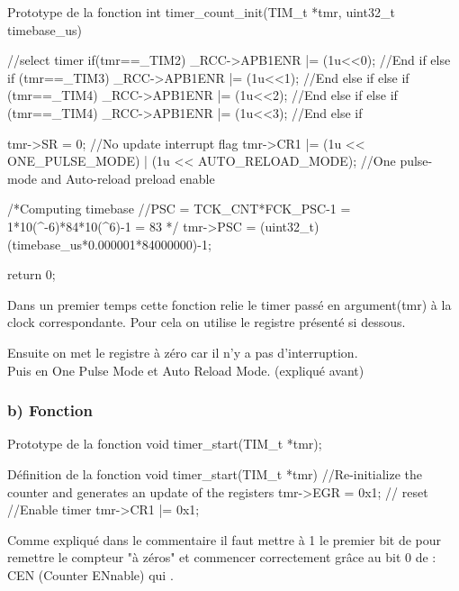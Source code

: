 \begin{Cpp}{Prototype de la fonction } 
int timer_count_init(TIM_t *tmr, uint32_t timebase_us)  {

		//select timer
		if(tmr==_TIM2) {
			_RCC->APB1ENR |= (1u<<0);	
		}//End if
		else if (tmr==_TIM3) {
			_RCC->APB1ENR |= (1u<<1);
		}//End else if
		else if (tmr==_TIM4) {
			_RCC->APB1ENR |= (1u<<2);
		}//End else if		
		else if (tmr==_TIM4) {
			_RCC->APB1ENR |= (1u<<3);
		}//End else if	
        
    	tmr->SR = 0; 														//No update interrupt flag
    	tmr->CR1 |=  (1u << ONE_PULSE_MODE) | (1u << AUTO_RELOAD_MODE);		//One pulse-mode and Auto-reload preload enable

		/*Computing timebase
		//PSC = TCK_CNT*FCK_PSC-1 = 1*10(^-6)*84*10(^6)-1 = 83
		*/
		tmr->PSC = (uint32_t) (timebase_us*0.000001*84000000)-1; 

		return 0;

}
\end{Cpp}

Dans un premier temps cette fonction relie le timer passé en argument(tmr) à la clock correspondante. Pour cela on utilise le registre  présenté si dessous.

Ensuite on met le registre  à zéro car il n'y a pas d'interruption.\\
Puis  en One Pulse Mode et Auto Reload Mode.
(expliqué avant)





\newpage
\subsubsection{b) Fonction}
\begin{Cpp}{Prototype de la fonction} 
void timer_start(TIM_t *tmr);
\end{Cpp}

\begin{Cpp}{Définition de la fonction} 
void timer_start(TIM_t *tmr) {
		//Re-initialize the counter and generates an update of the registers
		tmr->EGR = 0x1;		// reset
		//Enable timer
		tmr->CR1 |= 0x1; 
}
\end{Cpp}

Comme expliqué dans le commentaire il faut mettre à 1 le premier bit de  pour remettre le compteur "à zéros" et commencer correctement grâce au bit 0 de  : CEN (Counter ENnable) qui .

